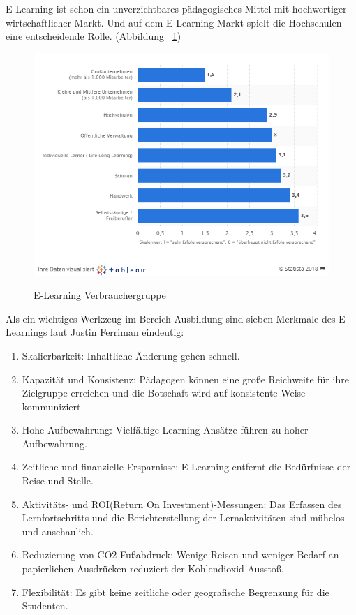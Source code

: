 E-Learning ist schon ein unverzichtbares pädagogisches Mittel mit hochwertiger wirtschaftlicher Markt. Und auf dem E-Learning Markt spielt die Hochschulen eine entscheidende Rolle. (Abbildung ~\ref{fig:zielgruppe})

\begin{figure}[ht]
\vspace*{1em}
\centering
\caption[E-Learning Verbrauchergruppe]{E-Learning Verbrauchergruppe}
\includegraphics[width=\textwidth]{images/zielgruppe.png}
\label{fig:zielgruppe} 
\end{figure}

Als ein wichtiges Werkzeug im Bereich Ausbildung sind sieben Merkmale des E-Learnings laut Justin Ferriman \citep{6} eindeutig:

\begin{enumerate}
\item Skalierbarkeit: Inhaltliche Änderung gehen schnell. 
\item Kapazität und Konsistenz: Pädagogen können eine große Reichweite für ihre Zielgruppe erreichen und die Botschaft wird auf konsistente Weise kommuniziert.
\item Hohe Aufbewahrung: Vielfältige Learning-Ansätze führen zu hoher Aufbewahrung.
\item Zeitliche und finanzielle Ersparnisse: E-Learning entfernt die Bedürfnisse der Reise und Stelle.
\item Aktivitäts- und ROI(Return On Investment)-Messungen: Das Erfassen des Lernfortschritts und die Berichterstellung der Lernaktivitäten sind mühelos und anschaulich.
\item Reduzierung von CO2-Fußabdruck: Wenige Reisen und weniger Bedarf an papierlichen Ausdrücken reduziert der Kohlendioxid-Ausstoß.
\item Flexibilität: Es gibt keine zeitliche oder geografische Begrenzung für die Studenten.
\end{enumerate}\

